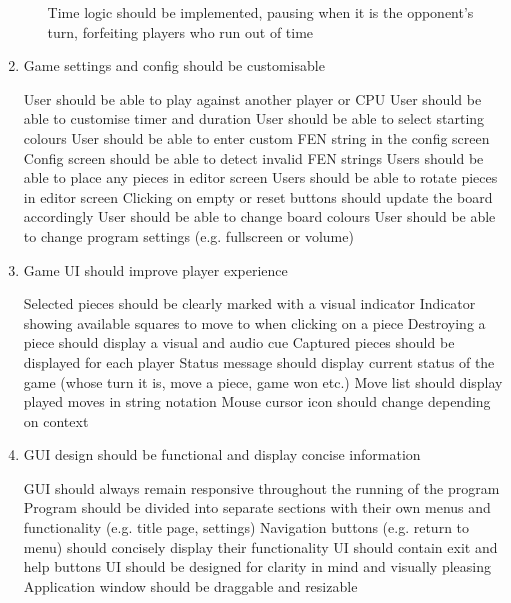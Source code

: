 \documentclass[../main/main.tex]{subfiles}
\begin{document}
\begin{enumerate}
\begin{enumerate}
    \objitem Time logic should be implemented, pausing when it is the opponent’s turn, forfeiting players who run out of time
    \end{enumerate}
\item Game settings and config should be customisable
    \begin{enumerate}
    \objitem User should be able to play against another player or CPU
    \objitem User should be able to customise timer and duration
    \objitem User should be able to select starting colours
    \objitem User should be able to enter custom FEN string in the config screen
    \objitem Config screen should be able to detect invalid FEN strings
    \objitem Users should be able to place any pieces in editor screen
    \objitem Users should be able to rotate pieces in editor screen
    \objitem Clicking on empty or reset buttons should update the board accordingly
    \objitem User should be able to change board colours
    \objitem User should be able to change program settings (e.g. fullscreen or volume)
    \end{enumerate}
\item Game UI should improve player experience
    \begin{enumerate}
    \objitem Selected pieces should be clearly marked with a visual indicator
    \objitem Indicator showing available squares to move to when clicking on a piece
    \objitem Destroying a piece should display a visual and audio cue
    \objitem Captured pieces should be displayed for each player
    \objitem Status message should display current status of the game (whose turn it is, move a piece, game won etc.)
    \objitem Move list should display played moves in string notation
    \objitem Mouse cursor icon should change depending on context
    \end{enumerate}
\item GUI design should be functional and display concise information
    \begin{enumerate}
    \objitem \label{itm:responsive-objective} GUI should always remain responsive throughout the running of the program
    \objitem Program should be divided into separate sections with their own menus and functionality (e.g. title page, settings)
    \objitem Navigation buttons (e.g. return to menu) should concisely display their functionality
    \objitem UI should contain exit and help buttons
    \objitem UI should be designed for clarity in mind and visually pleasing
    \objitem Application window should be draggable and resizable
    \end{enumerate}
\end{enumerate}
\end{document}
